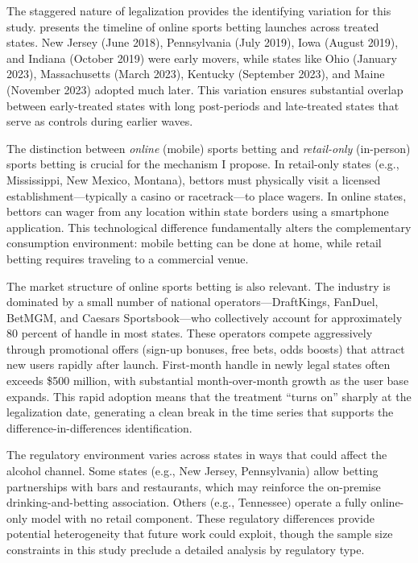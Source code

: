 \documentclass[12pt]{article}
\begin{document}
The staggered nature of legalization provides the identifying variation for this study.  presents the timeline of online sports betting launches across treated states. New Jersey (June 2018), Pennsylvania (July 2019), Iowa (August 2019), and Indiana (October 2019) were early movers, while states like Ohio (January 2023), Massachusetts (March 2023), Kentucky (September 2023), and Maine (November 2023) adopted much later. This variation ensures substantial overlap between early-treated states with long post-periods and late-treated states that serve as controls during earlier waves.

The distinction between \emph{online} (mobile) sports betting and \emph{retail-only} (in-person) sports betting is crucial for the mechanism I propose. In retail-only states (e.g., Mississippi, New Mexico, Montana), bettors must physically visit a licensed establishment---typically a casino or racetrack---to place wagers. In online states, bettors can wager from any location within state borders using a smartphone application. This technological difference fundamentally alters the complementary consumption environment: mobile betting can be done at home, while retail betting requires traveling to a commercial venue.

The market structure of online sports betting is also relevant. The industry is dominated by a small number of national operators---DraftKings, FanDuel, BetMGM, and Caesars Sportsbook---who collectively account for approximately 80 percent of handle in most states. These operators compete aggressively through promotional offers (sign-up bonuses, free bets, odds boosts) that attract new users rapidly after launch. First-month handle in newly legal states often exceeds \$500 million, with substantial month-over-month growth as the user base expands. This rapid adoption means that the treatment ``turns on'' sharply at the legalization date, generating a clean break in the time series that supports the difference-in-differences identification.

The regulatory environment varies across states in ways that could affect the alcohol channel. Some states (e.g., New Jersey, Pennsylvania) allow betting partnerships with bars and restaurants, which may reinforce the on-premise drinking-and-betting association. Others (e.g., Tennessee) operate a fully online-only model with no retail component. These regulatory differences provide potential heterogeneity that future work could exploit, though the sample size constraints in this study preclude a detailed analysis by regulatory type.
\end{document}
